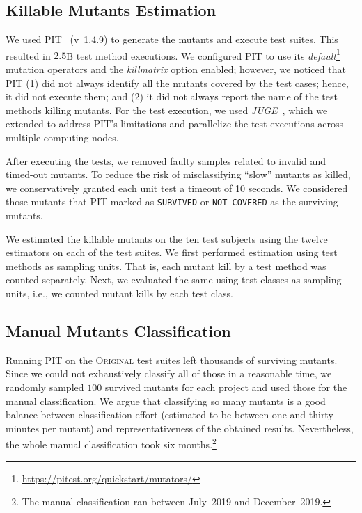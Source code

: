 \documentclass[sigconf]{acmart}
\newcommand{\estimatorCount}{twelve\xspace}
\newcommand{\projectCount}{ten\xspace}
\newcommand{\original}{\textsc{Original}\xspace}
\newcommand{\PIT}{\textsc{PIT}\xspace}
\begin{document}

\subsection{Killable Mutants Estimation}
\label{sec:estimation}
We used \PIT~\cite{pit} (v~1.4.9)
to generate the mutants
and execute test suites.
This resulted in $2.5$B test method executions.
We configured \PIT to use its \emph{default}\footnote{\url{https://pitest.org/quickstart/mutators/}}
mutation operators and the \emph{killmatrix} option enabled; however, we noticed that \PIT
(1) did not always identify all the mutants covered by the test cases; hence, it did not execute them;
and (2) it did not always report the name of the test methods killing mutants. %
For the test execution, we used \emph{JUGE}~\cite{DBLP:journals/corr/abs-2106-07520},
which we
extended to address \PIT's limitations and parallelize the test executions across multiple computing nodes.

After executing the tests, we
removed faulty samples related to invalid and timed-out mutants.
To reduce the risk of misclassifying ``slow'' mutants as killed,
we conservatively granted each unit test a timeout of 10 seconds.
We considered those mutants that 
\PIT marked as \texttt{SURVIVED} or \texttt{NOT\_COVERED} as the surviving mutants.

We estimated the killable mutants
on the \projectCount test subjects using the \estimatorCount 
estimators on each of the test suites. We first performed estimation %
using test methods as sampling units. That is, each
mutant kill by a test method was counted separately. Next, we evaluated
the same using test classes as sampling units, i.e., we counted
mutant kills by each test class.


\subsection{Manual Mutants Classification}
\label{sec:mutant-classification}
Running \PIT on the \original test suites left thousands of surviving mutants. 
Since we could not exhaustively classify all of those in a reasonable time, we randomly
sampled $100$ survived mutants for each project and used those 
for the manual classification.
We argue that classifying so many mutants is a good balance between classification
effort (estimated to be between one and thirty minutes per mutant) and representativeness 
of the obtained results. Nevertheless, the whole manual classification took six months.\footnote{The manual classification ran between July~2019 and December~2019.}
\end{document}
